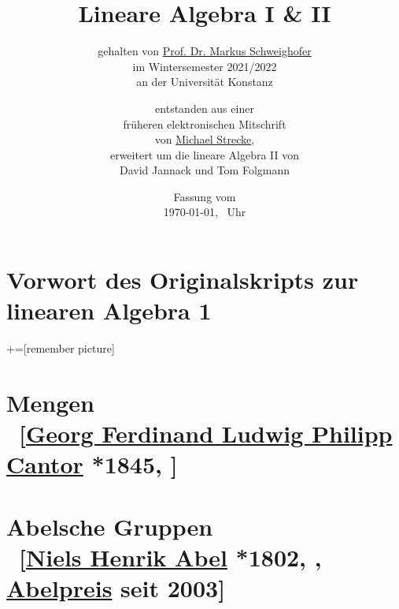 \documentclass[
twoside=semi, %
fontsize=12,
DIV=12, %
cleardoublepage=current,
leqno,
headings=optiontoheadandtoc, %
toc=idx %
]{scrbook}
\theoremstyle{definition}
\DeclareMathOperator\im{im}
\begin{document}
\subject{Skript zur Vorlesung}
\title{Lineare Algebra I \& II}
\subtitle{gehalten von \href{http://www.math.uni-konstanz.de/~schweigh/}{Prof. Dr. Markus Schweighofer}\\im Wintersemester 2021/2022\\an der Universität Konstanz}
\author{\small entstanden aus einer\\
\small früheren elektronischen Mitschrift\\
\small von \href{https://www.is.mpg.de/person/mstrecke}{Michael Strecke}, \\
\small erweitert um die lineare Algebra II von \\
\small David Jannack und Tom Folgmann}
\date{Fassung vom\\\today, \currenttime\ Uhr}
\frontmatter
\pagestyle{empty}

\maketitle

\noindent
    

\chapter*{Vorwort des Originalskripts zur linearen Algebra 1}
\pagestyle{scrheadings}
\manualmark
    

\tableofcontents

\mainmatter
{}+=[remember picture]

\chapter[tocentry={Mengen}]{Mengen \\ ~{\small[\href{http://de.wikipedia.org/wiki/Georg_Cantor}{Georg Ferdinand Ludwig Philipp Cantor} *1845, ]}}
    
    

\chapter[tocentry={Abelsche Gruppen}]{Abelsche Gruppen \\ ~{\small[\href{http://de.wikipedia.org/wiki/Niels_Henrik_Abel}{Niels Henrik Abel} *1802, , \href{http://de.wikipedia.org/wiki/Abelpreis}{Abelpreis} seit 2003]}}
    
\end{document}
